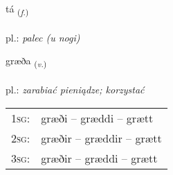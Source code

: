 \documentclass[frontgrid, backgrid]{flacards}\usepackage[]{graphicx}\usepackage[]{xcolor}
\begin{document}
\renewcommand{\flhead}{\vskip5pt \fboxsep=0pt {\small\bfseries\footnotesize Nafnorð | rzeczownik}}
\renewcommand{\fcfoot}{\vskip5pt \fboxsep=0pt \hspace{2pt}{\small\bfseries\footnotesize 3K}}

\renewcommand{\blhead}{\vskip5pt {\small\bfseries\footnotesize Nafnorð | rzeczownik }}
\renewcommand{\bcfoot}{\vskip5pt \hspace{2pt}{\small\bfseries\footnotesize 3K}}


{tá \small{\textsubscript{(\textit{f.})}} \\[1ex] %
\textphonetic{[tʰauː]} \\
pl.: \emph{palec (u nogi)} \\  [2ex]
\renewcommand*{\arraystretch}{0.8}
}

\renewcommand{\flhead}{\vskip5pt \fboxsep=0pt {\small\bfseries\footnotesize Sagnorð | czasownik}}
\renewcommand{\fcfoot}{\vskip5pt \fboxsep=0pt \hspace{2pt}{\small\bfseries\footnotesize 3K}}

\renewcommand{\blhead}{\vskip5pt {\small\bfseries\footnotesize Sagnorð | czasownik }}
\renewcommand{\bcfoot}{\vskip5pt \hspace{2pt}{\small\bfseries\footnotesize 3K}}


{græða \small{\textsubscript{(\textit{v.})}} \\[1ex] %
\textphonetic{[kraiːða]} \\
pl.: \emph{zarabiać pieniądze; korzystać} \\  [2ex]
\renewcommand*{\arraystretch}{0.8}
\begin{tabular}{p{1cm}l}
\textsc{1sg}: & græði -- græddi -- grætt \\ 
\textsc{2sg}: & græðir -- græddir -- grætt \\ 
\textsc{3sg}: & græðir -- græddi -- grætt \\ 
\end{tabular}
}
\end{document}
